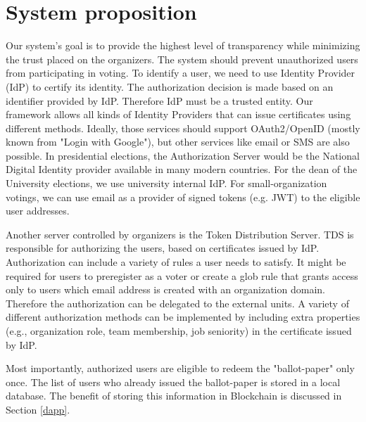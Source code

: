 \documentclass[applsci,article,submit,moreauthors,pdftex]{Definitions/mdpi}
\begin{document}
\section{System proposition}
\label{system}
Our system's goal is to provide the highest level of transparency while minimizing the trust placed on the organizers. The system should prevent unauthorized users from participating in voting. 
To identify a user, we need to use Identity Provider (IdP) to certify its identity. The authorization decision is made based on an identifier provided by IdP. Therefore IdP must be a trusted entity. Our framework allows all kinds of Identity Providers that can issue certificates using different methods. Ideally, those services should support OAuth2/OpenID (mostly known from "Login with Google"), but other services like email or SMS are also possible. 
In presidential elections, the Authorization Server would be the National Digital Identity provider available in many modern countries. For the dean of the University elections, we use university internal IdP. For small-organization votings, we can use email as a provider of signed tokens (e.g. JWT) to the eligible user addresses. 

Another server controlled by organizers is the Token Distribution Server. TDS is responsible for authorizing the users, based on certificates issued by IdP. Authorization can include a variety of rules a user needs to satisfy. It might be required for users to preregister as a voter or create a glob rule that grants access only to users which email address is created with an organization domain. Therefore the authorization can be delegated to the external units. A variety of different authorization methods can be implemented by including extra properties (e.g., organization role, team membership, job seniority) in the certificate issued by IdP.

Most importantly, authorized users are eligible to redeem the "ballot-paper" only once. The list of users who already issued the ballot-paper is stored in a local database. The benefit of storing this information in Blockchain is discussed in Section \ref{dapp}.
\end{document}
